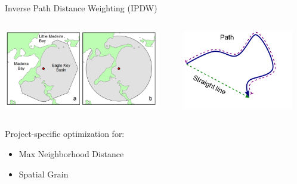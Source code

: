 \documentclass[compress,noflama,nosectionpages]{beamer}
\begin{document}
\begin{frame}{Inverse Path Distance Weighting (IPDW)}
	\vspace{6pt}
 	\begin{columns}
   	\begin{column}{6.8cm}
     	\includegraphics[width=6.8cm,keepaspectratio=true,clip=true,trim= 0mm 0mm 0mm 0mm]{figures/sm-figure1.png}
 		\end{column}

 		\begin{column}{5.4cm}
     	\includegraphics[width=4.8cm,keepaspectratio=true]{images/Picture1.png}
   	\end{column}
 \end{columns}
	Project-specific optimization for:
	\begin{itemize}
		\item{Max Neighborhood Distance}
		\item{Spatial Grain}
	\end{itemize}
	\vspace{4pt}
\end{frame}
\end{document}
